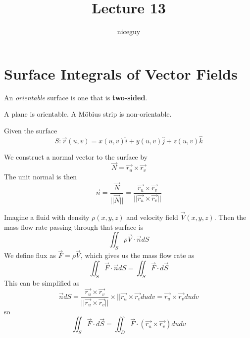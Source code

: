 \documentclass[12pt]{article}
\author{niceguy}
\title{Lecture 13}
\begin{document}
\maketitle

\section{Surface Integrals of Vector Fields}

\begin{defn}
	An \emph{orientable} surface is one that is \textbf{two-sided}.
\end{defn}

\begin{ex}
	A plane is orientable. A M\"obius strip is non-orientable.
\end{ex}

Given the surface
$$S: \vec{r}(u,v) = x(u,v)\hat{i} + y(u,v)\hat{j} + z(u,v)\hat{k}$$

We construct a normal vector to the surface by
$$\vec{N} = \vec{r_u} \times \vec{r_v}$$
The unit normal is then
$$\vec{n} = \frac{\vec{N}}{||\vec{N}||} = \frac{\vec{r_u} \times \vec{r_v}}{||\vec{r_u} \times \vec{r_v}||}$$

\begin{ex}
	Imagine a fluid with density $\rho(x,y,z)$ and velocity field $\vec{V}(x,y,z)$. Then the mass flow rate passing through that surface is
	$$\iint_S \rho\vec{V}\cdot\vec{n}dS$$
	We define flux as $\vec{F} = \rho\vec{V}$, which gives us the mass flow rate as
	$$\iint_S \vec{F}\cdot\vec{n}dS = \iint_S \vec{F} \cdot d\vec{S}$$
	This can be simplified as
	$$\vec{n}dS = \frac{\vec{r_u}\times\vec{r_v}}{||\vec{r_u}\times\vec{r_v}||} \times ||\vec{r_u}\times\vec{r_v}dudv = \vec{r_u}\times\vec{r_v}dudv$$
	so
	$$\iint_S \vec{F}\cdot d\vec{S} = \iint_D \vec{F}\cdot(\vec{r_u}\times\vec{r_v})dudv$$
\end{ex}
\end{document}
